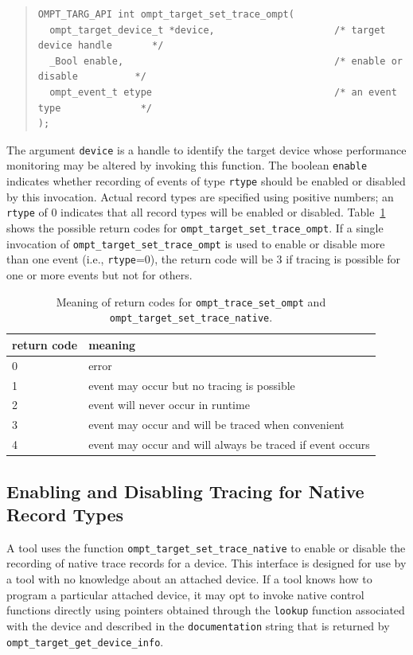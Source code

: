 \documentclass{article}
\begin{document}
\begin{quote}
\begin{verbatim}
OMPT_TARG_API int ompt_target_set_trace_ompt(
  ompt_target_device_t *device,                     /* target device handle       */
  _Bool enable,                                     /* enable or disable          */
  ompt_event_t etype                                /* an event type              */
);
\end{verbatim}
\end{quote}
The argument \verb|device| is a handle to identify the target device whose performance monitoring may be altered by invoking this function. 
The boolean \verb|enable| indicates whether recording of events of type \verb|rtype| should be enabled or disabled by this invocation.
Actual record types are specified using positive numbers; an \verb|rtype| of 0 indicates that all record types will be enabled or disabled.
Table~\ref{table:record_set} shows the possible return codes for \verb|ompt_target_set_trace_ompt|. 
If a single invocation of \verb|ompt_target_set_trace_ompt| is used to enable or disable more than one event (i.e., \verb|rtype|=0), the return code will be 3 if tracing is possible for one or more events but not for others.
\begin{table}
\centering
\begin{tabular}{|l|l|}
\hline
return code & meaning \\\hline
0 & error\\\hline
1 & event may occur but no tracing is possible\\\hline
2 & event will never occur in runtime\\\hline
3 & event may occur and will be traced  when convenient\\\hline
4 & event may occur and will always be traced if event occurs\\\hline
\end{tabular}
\caption{Meaning of return codes for {\tt ompt\_trace\_set\_ompt} and {\tt ompt\_target\_set\_trace\_native}.}
\label{table:record_set}
\end{table}




\subsection{Enabling and Disabling Tracing for Native Record Types}
\label{sec:trace-event-native}
A tool uses the function \verb|ompt_target_set_trace_native| to enable or disable the recording of native trace records for a device. This interface is designed for use by a tool with no 
knowledge about an attached device. If a tool knows how to program a particular attached device, it may opt to invoke native control functions directly using pointers obtained through the \verb|lookup| function associated with the device and described in the \verb|documentation| string that is returned by \verb|ompt_target_get_device_info|.
\end{document}
